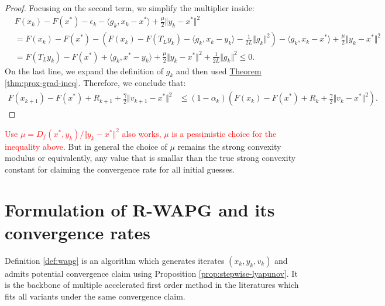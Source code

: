 \documentclass[12pt]{article}
\begin{document}
\begin{proof}
        Focusing on the second term, we simplify the multiplier inside: 
        {\small
        \begin{align*}
            & F(x_k) - F(x^*) - \epsilon_k - \langle g_k, x_k - x^*\rangle + \frac{\mu}{2}\Vert y_k - x^*\Vert^2
            \\
            &= 
            F(x_k) - F(x^*) - \left(
                F(x_k) - F(T_L y_k) - \langle g_k, x_k - y_k\rangle - \frac{1}{2L}\Vert g_k\Vert^2
            \right)- \langle g_k, x_k - x^*\rangle + \frac{\mu}{2}\Vert y_k - x^*\Vert^2
            \\
            &= F(T_L y_k) - F(x^*) + \langle g_k, x^* - y_k\rangle + \frac{\mu}{2}\Vert y_k - x^*\Vert^2
            + \frac{1}{2L}\Vert g_k\Vert^2 \le 0. 
        \tag{4*}    
        \end{align*}
        }
        On the last line, we expand the definition of $g_k$ and then used 
        \hyperref[thm:prox-grad-ineq]{Theorem \ref*{thm:prox-grad-ineq}}. 
        Therefore, we conclude that: 
        {\small
        \begin{align*}
            F(x_{k + 1}) - F(x^*) + R_{k + 1} + 
            \frac{\hat \gamma}{2}\Vert v_{k + 1} - x^*\Vert^2
            &\le 
            (1 - \alpha_k)\left(
                F(x_k) - F(x^*) + R_k + \frac{\gamma}{2}\Vert v_k - x^*\Vert^2
            \right). 
        \end{align*}
        }
    \end{proof}
    \begin{remark}
        \textcolor{red}
        {
        Use $\mu = D_f(x^*, y_k)/\Vert y_k - x^*\Vert^2$ also works, $\mu$ is a pessimistic choice for the inequality above. 
        }
        But in general the choice of $\mu$ remains the strong convexity modulus or equivalently, any value that is smallar than the true strong convexity constant for claiming the convergence rate for all initial guesses. 
    \end{remark}

\section{Formulation of R-WAPG and its convergence rates}
    Definition \ref{def:wapg} is an algorithm which generates iterates $(x_k, y_k, v_k)$ and admits potential convergence claim using Proposition \ref{prop:stepwise-lyapunov}. 
    It is the backbone of multiple accelerated first order method in the literatures which fits all variants under the same convergence claim. 
\end{document}
